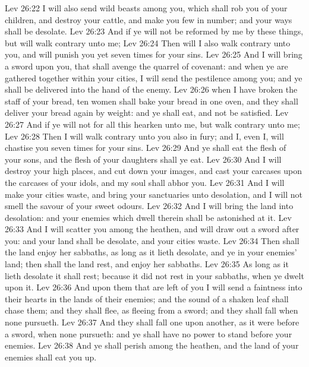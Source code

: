 \vs Lev 26:22 I will also send wild beasts among you, which shall rob you of your children, and destroy your cattle, and make you few in number; and your  ways shall be desolate.
\vs Lev 26:23 And if ye will not be reformed by me by these things, but will walk contrary unto me;
\vs Lev 26:24 Then will I also walk contrary unto you, and will punish you yet seven times for your sins.
\vs Lev 26:25 And I will bring a sword upon you, that shall avenge the quarrel of  covenant: and when ye are gathered together within your cities, I will send the pestilence among you; and ye shall be delivered into the hand of the enemy.
\vs Lev 26:26  when I have broken the staff of your bread, ten women shall bake your bread in one oven, and they shall deliver  your bread again by weight: and ye shall eat, and not be satisfied.
\vs Lev 26:27 And if ye will not for all this hearken unto me, but walk contrary unto me;
\vs Lev 26:28 Then I will walk contrary unto you also in fury; and I, even I, will chastise you seven times for your sins.
\vs Lev 26:29 And ye shall eat the flesh of your sons, and the flesh of your daughters shall ye eat.
\vs Lev 26:30 And I will destroy your high places, and cut down your images, and cast your carcases upon the carcases of your idols, and my soul shall abhor you.
\vs Lev 26:31 And I will make your cities waste, and bring your sanctuaries unto desolation, and I will not smell the savour of your sweet odours.
\vs Lev 26:32 And I will bring the land into desolation: and your enemies which dwell therein shall be astonished at it.
\vs Lev 26:33 And I will scatter you among the heathen, and will draw out a sword after you: and your land shall be desolate, and your cities waste.
\vs Lev 26:34 Then shall the land enjoy her sabbaths, as long as it lieth desolate, and ye  in your enemies' land;  then shall the land rest, and enjoy her sabbaths.
\vs Lev 26:35 As long as it lieth desolate it shall rest; because it did not rest in your sabbaths, when ye dwelt upon it.
\vs Lev 26:36 And upon them that are left  of you I will send a faintness into their hearts in the lands of their enemies; and the sound of a shaken leaf shall chase them; and they shall flee, as fleeing from a sword; and they shall fall when none pursueth.
\vs Lev 26:37 And they shall fall one upon another, as it were before a sword, when none pursueth: and ye shall have no power to stand before your enemies.
\vs Lev 26:38 And ye shall perish among the heathen, and the land of your enemies shall eat you up.
